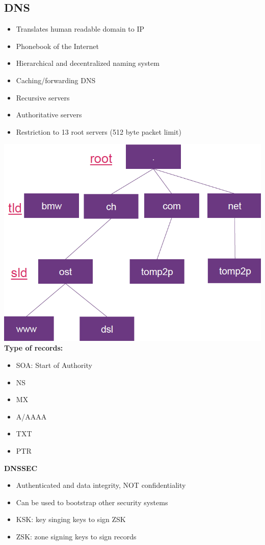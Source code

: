 \subsection{DNS}
\begin{itemize}
    \item Translates human readable domain to IP
    \item Phonebook of the Internet
    \item Hierarchical and decentralized naming system
    \item Caching/forwarding DNS
    \item Recursive servers
    \item Authoritative servers
    \item Restriction to 13 root servers (512 byte packet limit)
\end{itemize}
\includegraphics[width=\linewidth]{../img/dns.png}
\textbf{Type of records:}
\begin{itemize}
    \item SOA: Start of Authority
    \item NS
    \item MX
    \item A/AAAA
    \item TXT
    \item PTR
\end{itemize}
\textbf{DNSSEC}
\begin{itemize}
    \item Authenticated and data integrity, NOT confidentiality
    \item Can be used to bootstrap other security systems
    \item KSK: key singing keys to sign ZSK
    \item ZSK: zone signing keys to sign records
\end{itemize}

